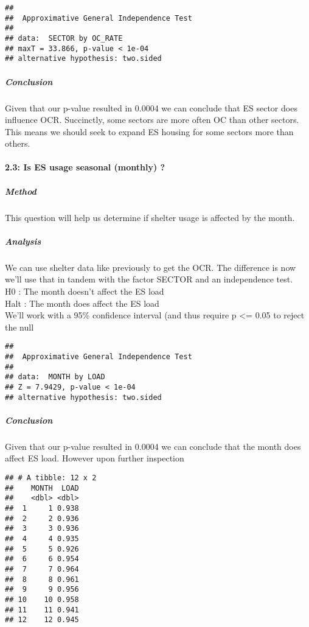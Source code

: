 \documentclass[
]{article}
\begin{document}
\begin{verbatim}
## 
##  Approximative General Independence Test
## 
## data:  SECTOR by OC_RATE
## maxT = 33.866, p-value < 1e-04
## alternative hypothesis: two.sided
\end{verbatim}

\hypertarget{conclusion-4}{%
\subparagraph{Conclusion}\label{conclusion-4}}

Given that our p-value resulted in 0.0004 we can conclude that ES sector
does influence OCR. Succinctly, some sectors are more often OC than
other sectors. This means we should seek to expand ES housing for some
sectors more than others.

\hypertarget{is-es-usage-seasonal-monthly}{%
\paragraph{2.3: Is ES usage seasonal (monthly)
?}\label{is-es-usage-seasonal-monthly}}

\hypertarget{method-5}{%
\subparagraph{Method}\label{method-5}}

This question will help us determine if shelter usage is affected by the
month.

\hypertarget{analysis-5}{%
\subparagraph{Analysis}\label{analysis-5}}

We can use shelter data like previously to get the OCR. The difference
is now we'll use that in tandem with the factor SECTOR and an
independence test.\\
H0 : The month doesn't affect the ES load\\
Halt : The month does affect the ES load\\
We'll work with a 95\% confidence interval (and thus require p
\textless= 0.05 to reject the null

\begin{verbatim}
## 
##  Approximative General Independence Test
## 
## data:  MONTH by LOAD
## Z = 7.9429, p-value < 1e-04
## alternative hypothesis: two.sided
\end{verbatim}

\hypertarget{conclusion-5}{%
\subparagraph{Conclusion}\label{conclusion-5}}

Given that our p-value resulted in 0.0004 we can conclude that the month
does affect ES load. However upon further inspection

\begin{verbatim}
## # A tibble: 12 x 2
##    MONTH  LOAD
##    <dbl> <dbl>
##  1     1 0.938
##  2     2 0.936
##  3     3 0.936
##  4     4 0.935
##  5     5 0.926
##  6     6 0.954
##  7     7 0.964
##  8     8 0.961
##  9     9 0.956
## 10    10 0.958
## 11    11 0.941
## 12    12 0.945
\end{verbatim}
\end{document}

